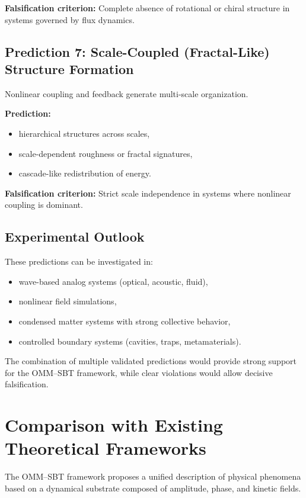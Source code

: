 \documentclass[11pt]{article}
\begin{document}
\textbf{Falsification criterion:}  
Complete absence of rotational or chiral structure in systems governed by flux dynamics.

\subsection{Prediction 7: Scale-Coupled (Fractal-Like) Structure Formation}

Nonlinear coupling and feedback generate multi-scale organization.

\textbf{Prediction:}
\begin{itemize}
\item hierarchical structures across scales,
\item scale-dependent roughness or fractal signatures,
\item cascade-like redistribution of energy.
\end{itemize}

\textbf{Falsification criterion:}  
Strict scale independence in systems where nonlinear coupling is dominant.

\subsection{Experimental Outlook}

These predictions can be investigated in:

\begin{itemize}
\item wave-based analog systems (optical, acoustic, fluid),
\item nonlinear field simulations,
\item condensed matter systems with strong collective behavior,
\item controlled boundary systems (cavities, traps, metamaterials).
\end{itemize}

The combination of multiple validated predictions would provide strong support for the OMM--SBT framework, while clear violations would allow decisive falsification.

\section{Comparison with Existing Theoretical Frameworks}

The OMM--SBT framework proposes a unified description of physical phenomena based on a dynamical substrate composed of amplitude, phase, and kinetic fields.
\end{document}
